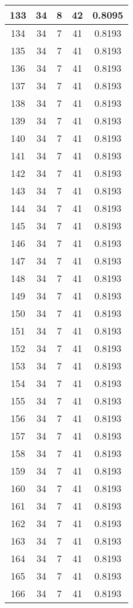 \documentclass[letterpaper, 12pt]{article}
\begin{document}
\begin{longtable}{|c|c|c|c|c|}
\hline
133 & 34 & 8 & 42 & 0.8095 \\
\hline
134 & 34 & 7 & 41 & 0.8193 \\
\hline
135 & 34 & 7 & 41 & 0.8193 \\
\hline
136 & 34 & 7 & 41 & 0.8193 \\
\hline
137 & 34 & 7 & 41 & 0.8193 \\
\hline
138 & 34 & 7 & 41 & 0.8193 \\
\hline
139 & 34 & 7 & 41 & 0.8193 \\
\hline
140 & 34 & 7 & 41 & 0.8193 \\
\hline
141 & 34 & 7 & 41 & 0.8193 \\
\hline
142 & 34 & 7 & 41 & 0.8193 \\
\hline
143 & 34 & 7 & 41 & 0.8193 \\
\hline
144 & 34 & 7 & 41 & 0.8193 \\
\hline
145 & 34 & 7 & 41 & 0.8193 \\
\hline
146 & 34 & 7 & 41 & 0.8193 \\
\hline
147 & 34 & 7 & 41 & 0.8193 \\
\hline
148 & 34 & 7 & 41 & 0.8193 \\
\hline
149 & 34 & 7 & 41 & 0.8193 \\
\hline
150 & 34 & 7 & 41 & 0.8193 \\
\hline
151 & 34 & 7 & 41 & 0.8193 \\
\hline
152 & 34 & 7 & 41 & 0.8193 \\
\hline
153 & 34 & 7 & 41 & 0.8193 \\
\hline
154 & 34 & 7 & 41 & 0.8193 \\
\hline
155 & 34 & 7 & 41 & 0.8193 \\
\hline
156 & 34 & 7 & 41 & 0.8193 \\
\hline
157 & 34 & 7 & 41 & 0.8193 \\
\hline
158 & 34 & 7 & 41 & 0.8193 \\
\hline
159 & 34 & 7 & 41 & 0.8193 \\
\hline
160 & 34 & 7 & 41 & 0.8193 \\
\hline
161 & 34 & 7 & 41 & 0.8193 \\
\hline
162 & 34 & 7 & 41 & 0.8193 \\
\hline
163 & 34 & 7 & 41 & 0.8193 \\
\hline
164 & 34 & 7 & 41 & 0.8193 \\
\hline
165 & 34 & 7 & 41 & 0.8193 \\
\hline
166 & 34 & 7 & 41 & 0.8193 \\

\end{longtable}
\end{document}
